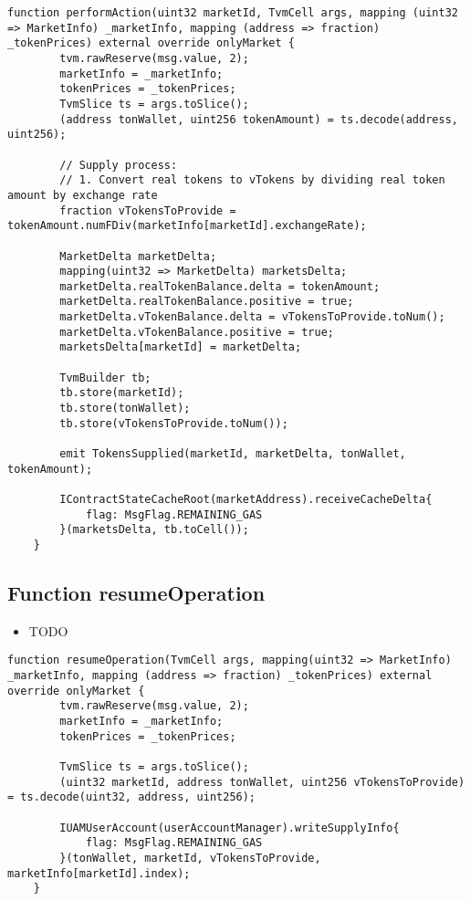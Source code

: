 \begin{lstlisting}[firstnumber=91]
    function performAction(uint32 marketId, TvmCell args, mapping (uint32 => MarketInfo) _marketInfo, mapping (address => fraction) _tokenPrices) external override onlyMarket {
        tvm.rawReserve(msg.value, 2);
        marketInfo = _marketInfo;
        tokenPrices = _tokenPrices;
        TvmSlice ts = args.toSlice();
        (address tonWallet, uint256 tokenAmount) = ts.decode(address, uint256);

        // Supply process:
        // 1. Convert real tokens to vTokens by dividing real token amount by exchange rate
        fraction vTokensToProvide = tokenAmount.numFDiv(marketInfo[marketId].exchangeRate);

        MarketDelta marketDelta;
        mapping(uint32 => MarketDelta) marketsDelta;
        marketDelta.realTokenBalance.delta = tokenAmount;
        marketDelta.realTokenBalance.positive = true;
        marketDelta.vTokenBalance.delta = vTokensToProvide.toNum();
        marketDelta.vTokenBalance.positive = true;
        marketsDelta[marketId] = marketDelta;

        TvmBuilder tb;
        tb.store(marketId);
        tb.store(tonWallet);
        tb.store(vTokensToProvide.toNum());

        emit TokensSupplied(marketId, marketDelta, tonWallet, tokenAmount);

        IContractStateCacheRoot(marketAddress).receiveCacheDelta{
            flag: MsgFlag.REMAINING_GAS
        }(marketsDelta, tb.toCell());
    }
\end{lstlisting}

\subsection{Function resumeOperation}

\noindent\begin{itemize}
\item TODO
\end{itemize}

\begin{lstlisting}[firstnumber=122]
    function resumeOperation(TvmCell args, mapping(uint32 => MarketInfo) _marketInfo, mapping (address => fraction) _tokenPrices) external override onlyMarket {
        tvm.rawReserve(msg.value, 2);
        marketInfo = _marketInfo;
        tokenPrices = _tokenPrices;

        TvmSlice ts = args.toSlice();
        (uint32 marketId, address tonWallet, uint256 vTokensToProvide) = ts.decode(uint32, address, uint256);

        IUAMUserAccount(userAccountManager).writeSupplyInfo{
            flag: MsgFlag.REMAINING_GAS
        }(tonWallet, marketId, vTokensToProvide, marketInfo[marketId].index);
    }
\end{lstlisting}

